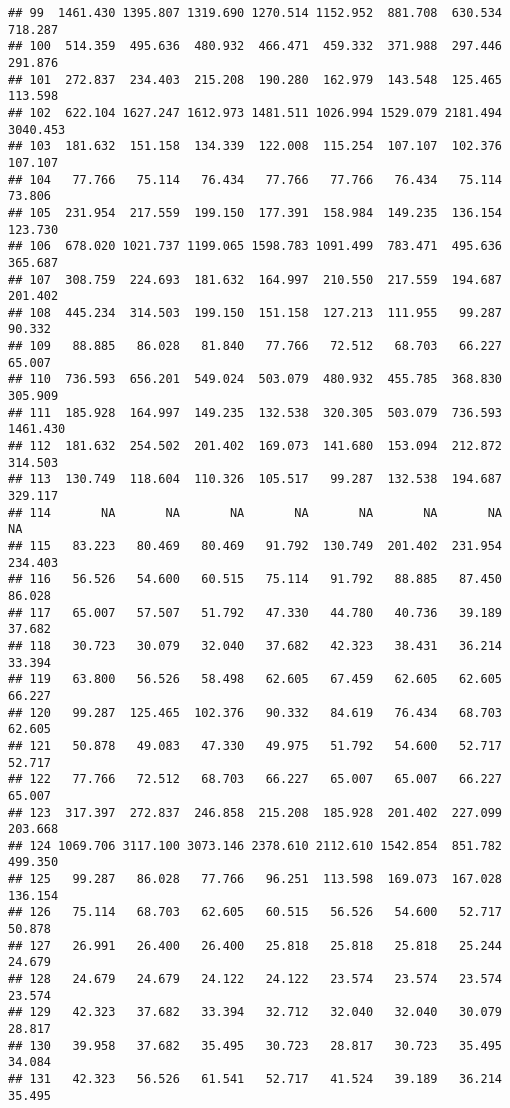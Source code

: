 \documentclass[
]{article}
\begin{document}
\begin{verbatim}
## 99  1461.430 1395.807 1319.690 1270.514 1152.952  881.708  630.534  718.287
## 100  514.359  495.636  480.932  466.471  459.332  371.988  297.446  291.876
## 101  272.837  234.403  215.208  190.280  162.979  143.548  125.465  113.598
## 102  622.104 1627.247 1612.973 1481.511 1026.994 1529.079 2181.494 3040.453
## 103  181.632  151.158  134.339  122.008  115.254  107.107  102.376  107.107
## 104   77.766   75.114   76.434   77.766   77.766   76.434   75.114   73.806
## 105  231.954  217.559  199.150  177.391  158.984  149.235  136.154  123.730
## 106  678.020 1021.737 1199.065 1598.783 1091.499  783.471  495.636  365.687
## 107  308.759  224.693  181.632  164.997  210.550  217.559  194.687  201.402
## 108  445.234  314.503  199.150  151.158  127.213  111.955   99.287   90.332
## 109   88.885   86.028   81.840   77.766   72.512   68.703   66.227   65.007
## 110  736.593  656.201  549.024  503.079  480.932  455.785  368.830  305.909
## 111  185.928  164.997  149.235  132.538  320.305  503.079  736.593 1461.430
## 112  181.632  254.502  201.402  169.073  141.680  153.094  212.872  314.503
## 113  130.749  118.604  110.326  105.517   99.287  132.538  194.687  329.117
## 114       NA       NA       NA       NA       NA       NA       NA       NA
## 115   83.223   80.469   80.469   91.792  130.749  201.402  231.954  234.403
## 116   56.526   54.600   60.515   75.114   91.792   88.885   87.450   86.028
## 117   65.007   57.507   51.792   47.330   44.780   40.736   39.189   37.682
## 118   30.723   30.079   32.040   37.682   42.323   38.431   36.214   33.394
## 119   63.800   56.526   58.498   62.605   67.459   62.605   62.605   66.227
## 120   99.287  125.465  102.376   90.332   84.619   76.434   68.703   62.605
## 121   50.878   49.083   47.330   49.975   51.792   54.600   52.717   52.717
## 122   77.766   72.512   68.703   66.227   65.007   65.007   66.227   65.007
## 123  317.397  272.837  246.858  215.208  185.928  201.402  227.099  203.668
## 124 1069.706 3117.100 3073.146 2378.610 2112.610 1542.854  851.782  499.350
## 125   99.287   86.028   77.766   96.251  113.598  169.073  167.028  136.154
## 126   75.114   68.703   62.605   60.515   56.526   54.600   52.717   50.878
## 127   26.991   26.400   26.400   25.818   25.818   25.818   25.244   24.679
## 128   24.679   24.679   24.122   24.122   23.574   23.574   23.574   23.574
## 129   42.323   37.682   33.394   32.712   32.040   32.040   30.079   28.817
## 130   39.958   37.682   35.495   30.723   28.817   30.723   35.495   34.084
## 131   42.323   56.526   61.541   52.717   41.524   39.189   36.214   35.495

\end{verbatim}
\end{document}
